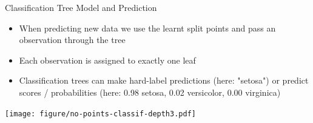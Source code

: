 \documentclass[11pt,compress,t,notes=noshow, xcolor=table]{beamer}
\begin{document}
\begin{vbframe}{Classification Tree Model and Prediction}
\begin{itemize}
\item When predicting new data we use the learnt split points and pass an observation through the tree
\item Each observation is assigned to exactly one leaf
\item Classification trees can make hard-label predictions (here: "setosa") or predict scores / probabilities (here: 0.98 setosa, 0.02 versicolor, 0.00 virginica)
\end{itemize}

\color{fgcolor}
{\centering \texttt{[image: figure/no-points-classif-depth3.pdf]}

}
\end{vbframe}
\end{document}
